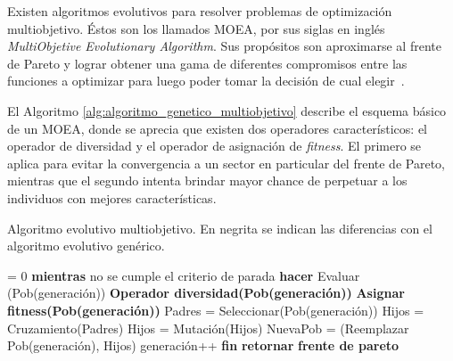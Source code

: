 Existen algoritmos evolutivos para resolver problemas de optimización multiobjetivo. Éstos son los llamados MOEA, por sus siglas en inglés \emph{ MultiObjetive Evolutionary Algorithm}. Sus propósitos son aproximarse al frente de Pareto y lograr obtener una gama de diferentes compromisos entre las funciones a optimizar para luego poder tomar la decisión de cual elegir~\citep{Deb2001}.


El Algoritmo \ref{alg:algoritmo_genetico_multiobjetivo} describe el esquema básico de un MOEA, donde se aprecia que existen dos operadores característicos: el operador de diversidad y el operador de asignación de \emph{fitness}. El primero se aplica para evitar la convergencia a un sector en particular del frente de Pareto, mientras que el segundo intenta brindar mayor chance de perpetuar a los individuos con mejores características.

\begin{algorithm}[ht]
	\caption[Algoritmo evolutivo multiobjetivo]{Algoritmo evolutivo multiobjetivo. En negrita se indican las diferencias con el algoritmo evolutivo genérico.}
	\label{alg:algoritmo_genetico_multiobjetivo}
	\begin{algorithmic} [1] 
		{
			 = 0
			\STATE \textbf{mientras} {no se cumple el criterio de parada} \textbf{hacer}
			\STATE\hspace{\algorithmicindent} {Evaluar (Pob(generación))}
			\STATE\hspace{\algorithmicindent} \textbf{Operador diversidad(Pob(generación))}
			\STATE\hspace{\algorithmicindent} \textbf{Asignar fitness(Pob(generación))}						
			\STATE\hspace{\algorithmicindent} {Padres = Seleccionar(Pob(generación))}
			\STATE\hspace{\algorithmicindent} {Hijos = Cruzamiento(Padres)}
			\STATE\hspace{\algorithmicindent} {Hijos = Mutación(Hijos)}
			\STATE\hspace{\algorithmicindent} {NuevaPob = (Reemplazar Pob(generación), Hijos)}
			\STATE\hspace{\algorithmicindent} {generación}++
			\STATE \textbf{fin}
			\STATE \textbf{retornar} \textbf{frente de pareto}
		}
	\end{algorithmic}
\end{algorithm}

